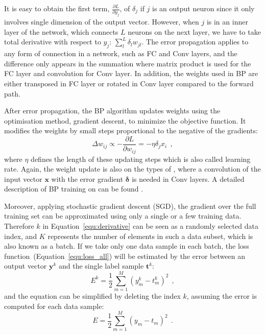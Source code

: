 It is easy to obtain the first term, $ \frac{\partial L}{\partial y_j}  $, of $ \delta_j $ if $j$ is an output neuron since it only involves \DIFaddbegin {}\DIFaddend single dimension of the output vector.
However, when $j$ is in an inner layer of the network, which connects \DIFaddbegin {}\DIFaddend $L$ neurons on the next layer, we have to take \DIFaddbegin {}\DIFaddend total derivative with respect to $y_j$: $\sum_l^L \delta_l w_{jl}$.
The error propagation applies to any form of connection in a network, such as FC and Conv layers, and the difference only appears in the summation where \DIFaddbegin {}\DIFaddend matrix product is used for the FC layer and convolution for \DIFaddbegin {}\DIFaddend Conv layer.
In addition, the weights used in BP are either transposed in \DIFaddbegin {}\DIFaddend FC layer or rotated in \DIFaddbegin {}\DIFaddend Conv layer compared to the forward path.

After error propagation, the BP algorithm updates weights using the optimisation method, gradient descent, to minimize the objective function.
It modifies the weights by small steps proportional to the negative of the gradients:
\begin{equation}
\Delta w_{ij} \propto -\frac{\partial L}{\partial w_{ij}} = -\eta \delta_j x_i~~,
\label{equ:delta_w}
\end{equation}
where $\eta$ defines the length of these updating steps which is also called \DIFaddbegin {}\DIFaddend learning rate.
Again, the weight update is also \DIFdelbegin {}\DIFdelend \DIFaddbegin {}\DIFaddend on the types of \DIFdelbegin {}\DIFdelend \DIFaddbegin {}\DIFaddend , where a convolution of the input vector $\mathbf{x}$ with the error gradient  $\mathbf{\delta}$ is needed in Conv layers.
A detailed description of BP training on \DIFdelbegin {}\DIFdelend \DIFaddbegin {}\DIFaddend can be found \DIFdelbegin {}\DIFdelend \DIFaddbegin {}\DIFaddend .

Moreover, applying stochastic gradient descent (SGD), the gradient over the full training set can be approximated using only a single or a few training data.
Therefore $k$ in Equation~\ref{equ:derivative} can be seen as a randomly selected data index, and $K$ represents the number of elements in such a data subset, which is also known as a batch.
If we take only one data sample in each batch, the loss function~(Equation~\ref{equ:loss_all}) will be estimated by the error between an output vector $\mathbf{y}^k$ and the single label sample $\mathbf{t}^k$:
\begin{equation}
E^k = \frac{1}{2}\sum_{m=1}^M (y^{k}_{m}-t^{k}_{m})^{2}~~,
\label{equ:error_conv}
\end{equation}
and the equation can be simplified by deleting the index $k$, assuming the error is computed for each data sample:
\begin{equation}
E = \frac{1}{2}\sum_{m=1}^M (y_{m}-t_{m})^{2}~~.
\label{equ:error_non}
\end{equation}


